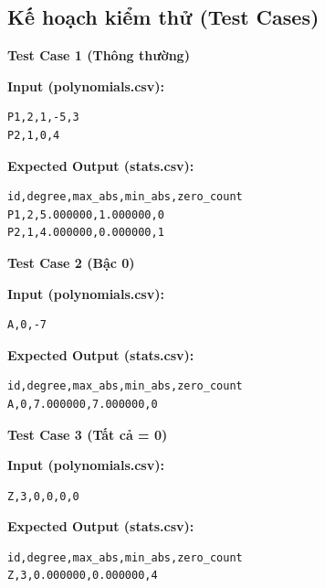 \subsection{Kế hoạch kiểm thử (Test Cases)}

\textbf{Test Case 1 (Thông thường)}

\textbf{Input (polynomials.csv):}
\begin{lstlisting}
P1,2,1,-5,3
P2,1,0,4
\end{lstlisting}

\textbf{Expected Output (stats.csv):}
\begin{lstlisting}
id,degree,max_abs,min_abs,zero_count
P1,2,5.000000,1.000000,0
P2,1,4.000000,0.000000,1
\end{lstlisting}

\vspace{0.5cm}

\textbf{Test Case 2 (Bậc 0)}

\textbf{Input (polynomials.csv):}
\begin{lstlisting}
A,0,-7
\end{lstlisting}

\textbf{Expected Output (stats.csv):}
\begin{lstlisting}
id,degree,max_abs,min_abs,zero_count
A,0,7.000000,7.000000,0
\end{lstlisting}

\vspace{0.5cm}

\textbf{Test Case 3 (Tất cả = 0)}

\textbf{Input (polynomials.csv):}
\begin{lstlisting}
Z,3,0,0,0,0
\end{lstlisting}

\textbf{Expected Output (stats.csv):}
\begin{lstlisting}
id,degree,max_abs,min_abs,zero_count
Z,3,0.000000,0.000000,4
\end{lstlisting}